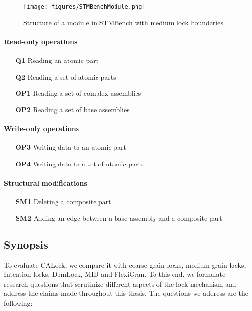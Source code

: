 \begin{figure}
    \centering
    \captionsetup{justification=centering}
    \texttt{[image: figures/STMBenchModule.png]}
    \caption{Structure of a module in STMBench with medium lock boundaries}
    \label{stmbenchModule}
\end{figure}



\paragraph{Read-only operations}

\begin{enumerate}
\item[\textbf{Q1}] Reading an atomic part
\item[\textbf{Q2}] Reading a set of atomic parts
\item[\textbf{OP1}] Reading a set of complex assemblies
\item[\textbf{OP2}] Reading a set of base assemblies
\end{enumerate}

\paragraph{Write-only operations}
\begin{enumerate}
\item[\textbf{OP3}] Writing data to an atomic part
\item[\textbf{OP4}] Writing data to a set of atomic parts
\end{enumerate}

\paragraph{Structural modifications}
\begin{enumerate}
\item[\textbf{SM1}] Deleting a composite part
\item[\textbf{SM2}] Adding an edge between a base assembly and a composite part
\end{enumerate}



\subsection{Synopsis}
To evaluate CALock, we compare it with coarse-grain locks, medium-grain locks, Intention locks, DomLock, MID and FlexiGran. To this end, we formulate research questions that scrutinize different aspects of the lock mechanism and address the claims made throughout this thesis. The questions we address are the following:

